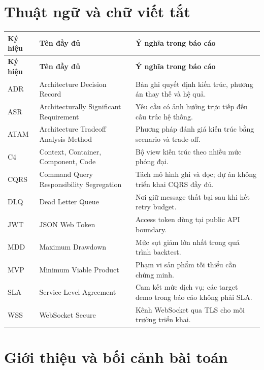 \documentclass[12pt,a4paper,oneside]{report}
\begin{document}
\chapter*{Thuật ngữ và chữ viết tắt}
\begin{longtable}{L{2.4cm}L{4.5cm}L{7.5cm}}
  \toprule
  \textbf{Ký hiệu} & \textbf{Tên đầy đủ} & \textbf{Ý nghĩa trong báo cáo} \\
  \midrule
  \endfirsthead
  \toprule
  \textbf{Ký hiệu} & \textbf{Tên đầy đủ} & \textbf{Ý nghĩa trong báo cáo} \\
  \midrule
  \endhead
  ADR & Architecture Decision Record & Bản ghi quyết định kiến trúc, phương án thay thế và hệ quả. \\
  ASR & Architecturally Significant Requirement & Yêu cầu có ảnh hưởng trực tiếp đến cấu trúc hệ thống. \\
  ATAM & Architecture Tradeoff Analysis Method & Phương pháp đánh giá kiến trúc bằng scenario và trade-off. \\
  C4 & Context, Container, Component, Code & Bộ view kiến trúc theo nhiều mức phóng đại. \\
  CQRS & Command Query Responsibility Segregation & Tách mô hình ghi và đọc; dự án không triển khai CQRS đầy đủ. \\
  DLQ & Dead Letter Queue & Nơi giữ message thất bại sau khi hết retry budget. \\
  JWT & JSON Web Token & Access token dùng tại public API boundary. \\
  MDD & Maximum Drawdown & Mức sụt giảm lớn nhất trong quá trình backtest. \\
  MVP & Minimum Viable Product & Phạm vi sản phẩm tối thiểu cần chứng minh. \\
  SLA & Service Level Agreement & Cam kết mức dịch vụ; các target demo trong báo cáo không phải SLA. \\
  WSS & WebSocket Secure & Kênh WebSocket qua TLS cho môi trường triển khai. \\
  \bottomrule
\end{longtable}

\clearpage
{}
\setcounter{page}{1}

\chapter{Giới thiệu và bối cảnh bài toán}
\label{chap:introduction}
\end{document}
